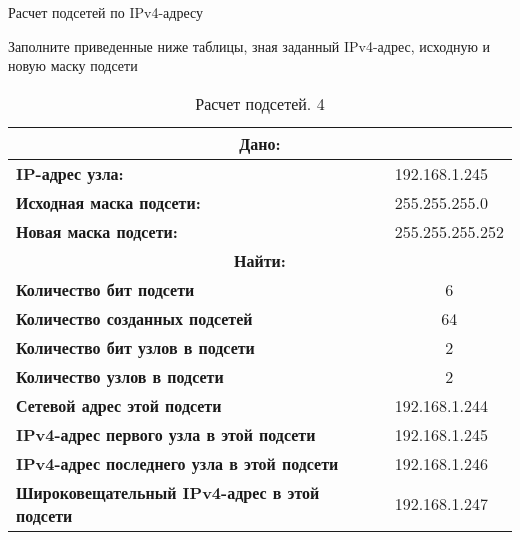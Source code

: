 \documentclass[a4paper,14pt]{extarticle}
\begin{document}
\begin{mypart}{Расчет подсетей по IPv4-адресу}
\begin{step}{Заполните приведенные ниже таблицы, зная заданный IPv4-адрес, исходную и
			новую маску подсети}
\begin{table}[h!]
	\centering
	\caption{Расчет подсетей. 4}
	\begin{tabular}{|l|l|}
		\hline
			\multicolumn{2}{|c|}{\textbf{Дано:}}  \\ \hline
		\textbf{IP-адрес узла:} & 192.168.1.245 \\ \hline
		\textbf{Исходная маска подсети:} & 255.255.255.0 \\ \hline
		\textbf{Новая маска подсети:} & 255.255.255.252 \\ \hline
			\multicolumn{2}{|c|}{\textbf{Найти:}}  \\ \hline
		\textbf{Количество бит подсети} & \multicolumn{1}{c|}{6} \\ \hline
		\textbf{Количество созданных подсетей} & \multicolumn{1}{c|}{64} \\ \hline
		\textbf{Количество бит узлов в подсети} & \multicolumn{1}{c|}{2} \\ \hline
		\textbf{Количество узлов в подсети} & \multicolumn{1}{c|}{2} \\ \hline
		\textbf{Сетевой адрес этой подсети} & 192.168.1.244 \\ \hline
		\textbf{IPv4-адрес первого узла в этой подсети} & 192.168.1.245 \\ \hline
		\textbf{IPv4-адрес последнего узла в этой подсети} & 192.168.1.246 \\ \hline
		\textbf{Широковещательный IPv4-адрес в этой подсети} & 192.168.1.247 \\ \hline
	\end{tabular}
	\label{}
\end{table}



\end{step}
\end{mypart}
\end{document}

